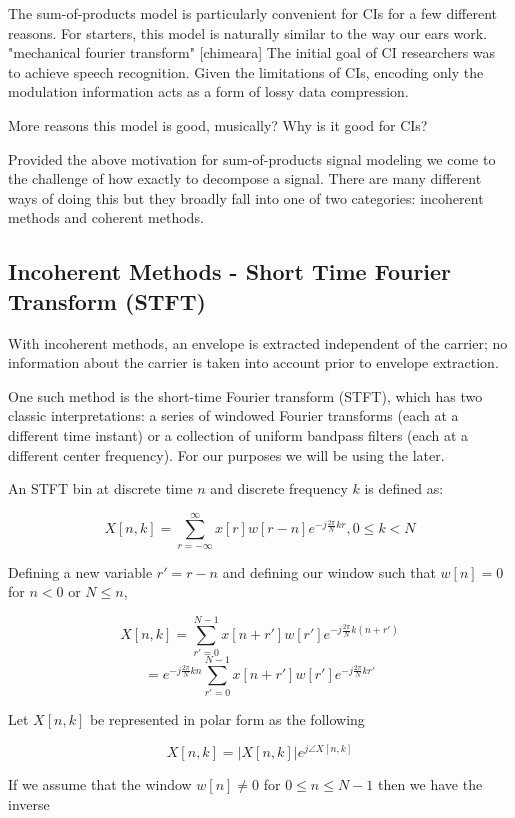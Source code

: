 \documentclass [11pt, proquest] {uwthesis}[2015/03/03]
\begin{document}
The sum-of-products model is particularly convenient for CIs for a few different reasons. For starters, this model is naturally similar to the way our ears work. "mechanical fourier transform" [chimeara] The initial goal of CI researchers was to achieve speech recognition.  Given the limitations of CIs, encoding only the modulation information acts as a form of lossy data compression.

More reasons this model is good, musically?
Why is it good for CIs?

Provided the above motivation for sum-of-products signal modeling we come to the challenge of how exactly to decompose a signal.  There are many different ways of doing this but they broadly fall into one of two categories: incoherent methods and coherent methods.

\subsection{Incoherent Methods - Short Time Fourier Transform (STFT)}

With incoherent methods, an envelope is extracted independent of the carrier; no information about the carrier is taken into account prior to envelope extraction.

One such method is the short-time Fourier transform (STFT), which has two classic interpretations: a series of windowed Fourier transforms (each at a different time instant) or a collection of uniform bandpass filters (each at a different center frequency).  For our purposes we will be using the later.

An STFT bin at discrete time $n$ and discrete frequency $k$ is defined as:

$$X[n,k] = \sum\limits_{r=-\infty}^{\infty} x[r] w[r - n] e^{-j\frac{2\pi}{N}kr}, 0 \leq k < N$$

Defining a new variable $r' = r - n$ and defining our window such that  $w[n] = 0$ for $n < 0$ or $N \leq n$,

$$X[n,k] = \sum\limits_{r'=0}^{N-1} x[n + r'] w[r'] e^{-j\frac{2\pi}{N}k(n + r')}$$
$$= e^{-j\frac{2\pi}{N}kn} \sum\limits_{r'=0}^{N-1} x[n + r'] w[r'] e^{-j\frac{2\pi}{N}kr'}$$

Let $X[n,k]$ be represented in polar form as the following

$$X[n,k] = \vert X[n,k]\vert e^{j\angle X[n,k]}$$

If we assume that the window $w[n] \neq 0$ for $0 \leq n \leq N-1$ then we have the inverse
\end{document}
